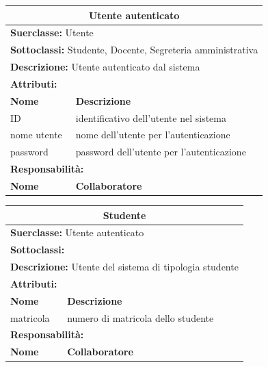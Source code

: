\documentclass[11pt]{article}
\begin{document}
\begin{table}[H]
\centering
\begin{tabularx}{1\textwidth}{|X|X|}\hline
\multicolumn{2}{|c|}{\textbf{Utente autenticato}}\\\hline
\multicolumn{2}{|l|}{\textbf{Suerclasse:} Utente}\\\hline
\multicolumn{2}{|l|}{\textbf{Sottoclassi:} Studente, Docente, Segreteria amministrativa}\\\hline
\multicolumn{2}{|l|}{\textbf{Descrizione:} Utente autenticato dal sistema}\\\hline
\multicolumn{2}{|l|}{\textbf{Attributi:}}\\
\textbf{Nome} & \textbf{Descrizione}\\
ID & identificativo dell'utente nel sistema\\
nome utente & nome dell'utente per l'autenticazione\\
password & password dell'utente per l'autenticazione\\
\hline
\multicolumn{2}{|l|}{\textbf{Responsabilità:}}\\
\textbf{Nome} & \textbf{Collaboratore}\\
\hline
\end{tabularx}
\end{table}



\begin{table}[H]
\centering
\begin{tabularx}{1\textwidth}{|X|X|}\hline
\multicolumn{2}{|c|}{\textbf{Studente}}\\\hline
\multicolumn{2}{|l|}{\textbf{Suerclasse:} Utente autenticato}\\\hline
\multicolumn{2}{|l|}{\textbf{Sottoclassi:} }\\\hline
\multicolumn{2}{|l|}{\textbf{Descrizione:} Utente del sistema di tipologia studente}\\\hline
\multicolumn{2}{|l|}{\textbf{Attributi:}}\\
\textbf{Nome} & \textbf{Descrizione}\\
matricola & numero di matricola dello studente\\
\hline
\multicolumn{2}{|l|}{\textbf{Responsabilità:}}\\
\textbf{Nome} & \textbf{Collaboratore}\\
\hline
\end{tabularx}
\end{table}
\end{document}
